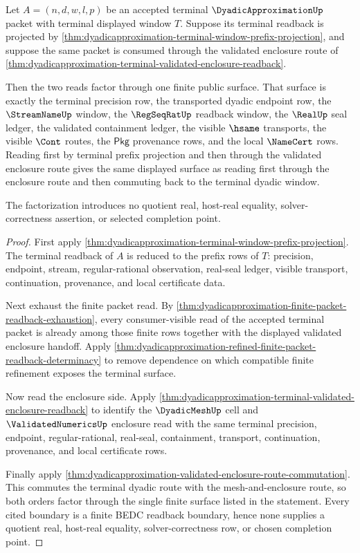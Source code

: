 \begin{theorem}
\label{thm:dyadicapproximation-terminal-window-two-stage-factorization}
Let $A=(n,d,w,l,p)$ be an accepted terminal $\DyadicApproximationUp$ packet with
terminal displayed window $T$. Suppose its terminal readback is projected by
\autoref{thm:dyadicapproximation-terminal-window-prefix-projection}, and suppose
the same packet is consumed through the validated enclosure route of
\autoref{thm:dyadicapproximation-terminal-validated-enclosure-readback}.

Then the two reads factor through one finite public surface. That surface is
exactly the terminal precision row, the transported dyadic endpoint row, the
$\StreamNameUp$ window, the $\RegSeqRatUp$ readback window, the $\RealUp$ seal
ledger, the validated containment ledger, the visible $\hsame$ transports, the
visible $\Cont$ routes, the $\mathsf{Pkg}$ provenance rows, and the local
$\NameCert$ rows. Reading first by terminal prefix projection and then through
the validated enclosure route gives the same displayed surface as reading first
through the enclosure route and then commuting back to the terminal dyadic
window.

The factorization introduces no quotient real, host-real equality,
solver-correctness assertion, or selected completion point.
\end{theorem}
\begin{proof}
First apply
\autoref{thm:dyadicapproximation-terminal-window-prefix-projection}. The
terminal readback of $A$ is reduced to the prefix rows of $T$: precision,
endpoint, stream, regular-rational observation, real-seal ledger, visible
transport, continuation, provenance, and local certificate data.

Next exhaust the finite packet read. By
\autoref{thm:dyadicapproximation-finite-packet-readback-exhaustion}, every
consumer-visible read of the accepted terminal packet is already among those
finite rows together with the displayed validated enclosure handoff. Apply
\autoref{thm:dyadicapproximation-refined-finite-packet-readback-determinacy} to
remove dependence on which compatible finite refinement exposes the terminal
surface.

Now read the enclosure side. Apply
\autoref{thm:dyadicapproximation-terminal-validated-enclosure-readback} to
identify the $\DyadicMeshUp$ cell and $\ValidatedNumericsUp$ enclosure read with
the same terminal precision, endpoint, regular-rational, real-seal,
containment, transport, continuation, provenance, and local certificate rows.

Finally apply
\autoref{thm:dyadicapproximation-validated-enclosure-route-commutation}. This
commutes the terminal dyadic route with the mesh-and-enclosure route, so both
orders factor through the single finite surface listed in the statement. Every
cited boundary is a finite BEDC readback boundary, hence none supplies a
quotient real, host-real equality, solver-correctness row, or chosen completion
point.
\end{proof}
